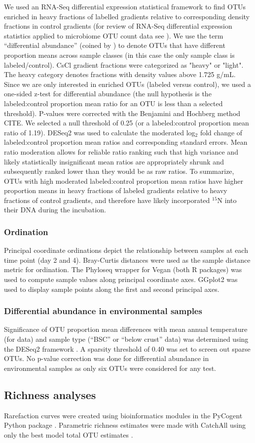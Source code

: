 We used an RNA-Seq differential expression statistical framework
\citep{Love_2014} to find OTUs enriched in heavy fractions of labelled
gradients relative to corresponding density fractions in control gradients (for
review of RNA-Seq differential expression statistics applied to microbiome OTU
count data see \citet{24699258}). We use the term “differential abundance”
(coined by \citet{24699258}) to denote OTUs that have different proportion
means across sample classes (in this case the only sample class is
labeled/control).  CsCl gradient fractions were categorized as "heavy" or
"light". The heavy category denotes fractions with density values above 1.725
g/mL. Since we are only interested in enriched OTUs (labeled versus control),
we used a one-sided z-test for differential abundance (the null hypothesis is
the labeled:control proportion mean ratio for an OTU is less than a selected
threshold). P-values were corrected with the Benjamini and Hochberg method
CITE. We selected a null threshold of 0.25 (or a labeled:control proportion
mean ratio of 1.19). DESeq2 was used to calculate the moderated
log$_{2}$ fold change of labeled:control proportion mean ratios and
corresponding standard errors. Mean ratio moderation allows for reliable ratio
ranking such that high variance and likely statistically insignificant mean
ratios are appropriately shrunk and subsequently ranked lower than they would
be as raw ratios. To summarize, OTUs with high moderated labeled:control proportion
mean ratios have higher proportion means in heavy fractions of labeled
gradients relative to heavy fractions of control gradients, and therefore have
likely incorporated $^{15}$N into their DNA during the incubation.

\subsubsection{Ordination}
Principal coordinate ordinations depict the relationship between samples at
each time point (day 2 and 4). Bray-Curtis distances were used as the sample
distance metric for ordination. The Phyloseq \citep{24699258} wrapper for Vegan
\citep{vegan} (both R packages) was used to compute sample values along
principal coordinate axes. GGplot2 \citep{ggplot2} was used to display sample
points along the first and second principal axes.  

\subsubsection{Differential abundance in environmental samples}
Significance of OTU proportion mean differences with mean annual temperature
(for \citet{Garcia_Pichel_2013} data) and sample type (``BSC'' or ``below crust''
\citet{Steven_2013} data) was determined using the DESeq2 framework
\citep{24699258, Love_2014}. A sparsity threshold of 0.40 was set to screen out
sparse OTUs. No p-value correction was done for differential abundance in 
environmental samples as only six OTUs were considered for any test.

\subsection{Richness analyses} Rarefaction curves were created using
bioinformatics modules in the PyCogent Python package \citep{Knight_2007}.
Parametric richness estimates were made with CatchAll using only the best model
total OTU estimates \citep{BUNGE_2010}.
